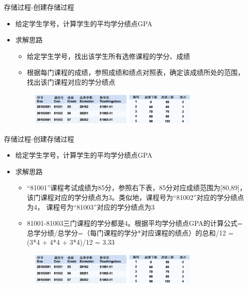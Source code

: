 \begin{frame}[fragile]{存储过程-创建存储过程}
\begin{itemize}
    \item 给定学生学号，计算学生的平均学分绩点GPA
    \item 求解思路
    \begin{itemize}
        \item 给定学生学号，找出该学生所有选修课程的学分、成绩
        \item 根据每门课程的成绩，参照成绩和绩点对照表，确定该成绩所处的范围，找出该门课程对应的学分绩点
    \end{itemize}
       \begin{figure}
        \centering
        \includegraphics[width=0.8\textwidth]{figure/fig-9.jpg}
    \end{figure}

\end{itemize}
\end{frame}

\begin{frame}[fragile]{存储过程-创建存储过程}
\begin{itemize}
    \item 给定学生学号，计算学生的平均学分绩点GPA
    \item 求解思路
    \begin{itemize}
        \item “81001”课程考试成绩为85分，参照右下表，85分对应成绩范围为[80,89]，该门课程对应的学分绩点为3。类似地，课程号为“81002”对应的学分绩点为4， 课程号为“81003”对应的学分绩点为3
        \item 81001-81003三门课程的学分都是4。根据平均学分绩点GPA的计算公式=总学分绩/总学分=（每门课程的学分*对应课程的绩点）的总和/12 = (3*4 + 4*4 + 3*4)/12 = 3.33	
    \end{itemize}
       \begin{figure}
        \centering
        \includegraphics[width=0.8\textwidth]{figure/fig-9.jpg}
    \end{figure}
\end{itemize}
\end{frame}

